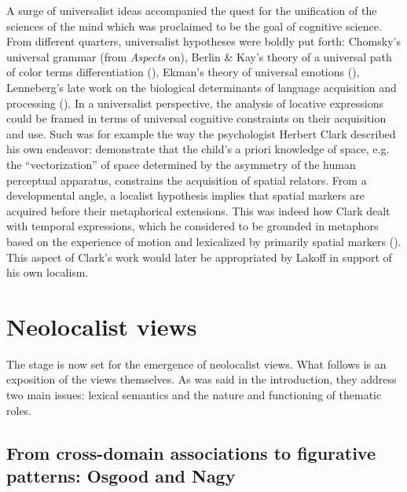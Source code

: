 \documentclass[output=paper]{langscibook}
\begin{document}
A surge of universalist ideas accompanied the quest for the unification of the sciences of the mind which was proclaimed to be the goal of cognitive science. From different quarters, universalist hypotheses were boldly put forth: Chomsky’s universal grammar (from \textit{Aspects} on), Berlin \& Kay’s theory of a universal path of color terms differentiation (\citealt{berlin_basic_1969}), Ekman’s theory of universal emotions (\citealt{ekman_universals_1971}), Lenneberg’s late work on the biological determinants of language acquisition and processing (\citealt{lenneberg_biological_1967}). In a universalist perspective, the analysis of locative expressions could be framed in terms of universal cognitive constraints on their acquisition and use. Such was for example the way the psychologist Herbert Clark described his own endeavor: demonstrate that the child’s a priori knowledge of space, e.g. the “vectorization” of space determined by the asymmetry of the human perceptual apparatus, constrains the acquisition of spatial relators. From a developmental angle, a localist hypothesis implies that spatial markers are acquired before their metaphorical extensions. This was indeed how Clark dealt with temporal expressions, which he considered to be grounded in metaphors based on the experience of motion and lexicalized by primarily spatial markers (\citealt{moore_space_1973}). This aspect of Clark’s work would later be appropriated by Lakoff in support of his own localism. 

\section{Neolocalist views}

The stage is now set for the emergence of neolocalist views. What follows is an exposition of the views themselves. As was said in the introduction, they address two main issues: lexical semantics and the nature and functioning of thematic roles. 

\subsection{From cross-domain associations to figurative patterns: Osgood and Nagy}
\end{document}

